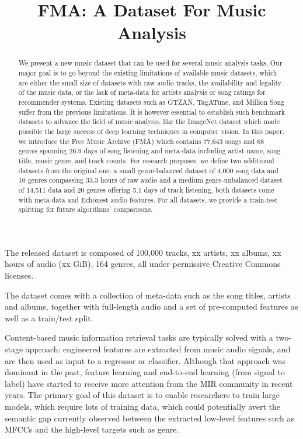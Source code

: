 \documentclass{article}
\title{FMA: A Dataset For Music Analysis}
\begin{document}
\maketitle

\begin{abstract}
We present a new music dataset that can be used for several music analysis tasks. Our major goal is to go beyond the existing limitations of available music datasets, which are either the small size of datasets with raw audio tracks, the availability and legality of the music data, or the lack of meta-data for artists analysis or song ratings for recommender systems. Existing datasets such as GTZAN, TagATune, and Million Song suffer from the previous limitations. It is however essential to establish such benchmark datasets to advance the field of music analysis, like the ImageNet dataset which made possible the large success of deep learning techniques in computer vision. In this paper, we introduce the Free Music Archive (FMA) which contains 77,643 songs and 68 genres spanning 26.9 days of song listening and meta-data including artist name, song title, music genre, and track counts. For research purposes, we define two additional datasets from the original one: a small genre-balanced dataset of 4,000 song data and 10 genres compassing 33.3 hours of raw audio and a medium genre-unbalanced dataset of 14,511 data and 20 genres offering 5.1 days of track listening, both datasets come with meta-data and Echonest audio features. For all datasets, we provide a train-test splitting for future algorithms' comparisons.
\end{abstract}


The released dataset is composed of 100,000 tracks, xx artists, xx albums, xx hours of audio (xx GiB), 164 genres, all under permissive Creative Commons licenses.

The dataset comes with a collection of meta-data such as the song titles, artists and albums, together with full-length audio and a set of pre-computed features as well as a train/test split.

Content-based music information retrieval tasks are typically solved with a two-stage approach: engineered features are extracted from music audio signals, and are then used as input to a regressor or classifier.
Although that approach was dominant in the past, feature learning and end-to-end learning (from signal to label) have started to receive more attention from the MIR community in recent years. 
The primary goal of this dataset is to enable researchers to train large models, which require lots of training data, which could potentially avert the semantic gap currently observed between the extracted low-level features such as MFCCs and the high-level targets such as genre.
\end{document}
